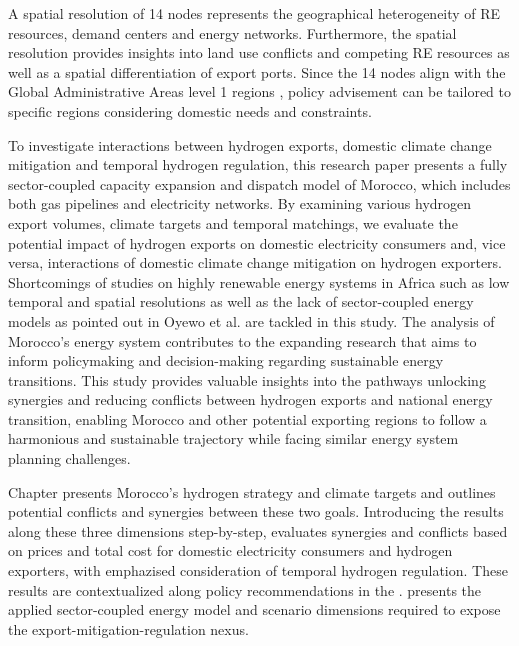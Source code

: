A spatial resolution of 14 nodes represents the geographical heterogeneity of RE resources, demand centers and energy networks. Furthermore, the spatial resolution provides insights into land use conflicts and competing RE resources as well as a spatial differentiation of export ports. Since the 14 nodes align with the Global Administrative Areas level 1 regions \cite{gadm2022}, policy advisement can be tailored to specific regions considering domestic needs and constraints.


To investigate interactions between hydrogen exports, domestic climate change mitigation and temporal hydrogen regulation, this research paper presents a fully sector-coupled capacity expansion and dispatch model of Morocco, which includes both gas pipelines and electricity networks. By examining various hydrogen export volumes, climate targets and temporal matchings, we evaluate the potential impact of hydrogen exports on domestic electricity consumers and, vice versa, interactions of domestic climate change mitigation on hydrogen exporters.
Shortcomings of studies on highly renewable energy systems in Africa such as low temporal and spatial resolutions as well as the lack of sector-coupled energy models as pointed out in Oyewo et al.\cite{Oyewo2023} are tackled in this study. The analysis of Morocco's energy system contributes to the expanding research that aims to inform policymaking and decision-making regarding sustainable energy transitions. This study provides valuable insights into the pathways unlocking synergies and reducing conflicts between hydrogen exports and national energy transition, enabling Morocco and other potential exporting regions to follow a harmonious and sustainable trajectory while facing similar energy system planning challenges.

Chapter  presents Morocco's hydrogen strategy and climate targets and outlines potential conflicts and synergies between these two goals. Introducing the results along these three dimensions step-by-step,  evaluates synergies and conflicts based on prices and total cost for domestic electricity consumers and hydrogen exporters, with emphazised consideration of temporal hydrogen regulation. These results are contextualized along policy recommendations in the .  presents the applied sector-coupled energy model and scenario dimensions required to expose the export-mitigation-regulation nexus.
